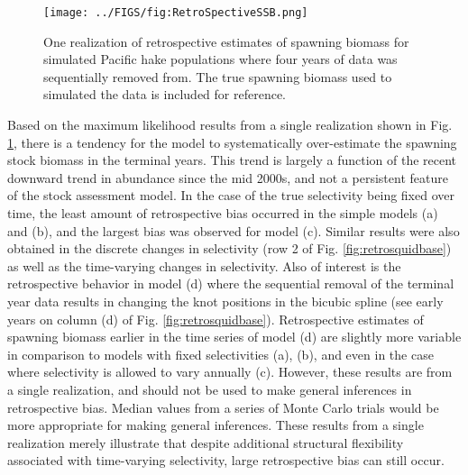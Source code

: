 \begin{figure}[!tbh]
	\begin{center}
		\texttt{[image: ../FIGS/fig:RetroSpectiveSSB.png]}
	\end{center}
	\caption{One realization of retrospective estimates of spawning biomass for simulated Pacific hake populations where four years of data was sequentially removed from.  The true spawning biomass used to simulated the data is included for reference.}
	\label{fig:retrospectiveSSB}
\end{figure}

Based on the maximum likelihood results from a single realization shown in Fig. \ref{fig:retrospectiveSSB}, there is a tendency for the model to systematically over-estimate the spawning stock biomass in the terminal years.  This trend is largely a function of the recent downward trend in abundance since the mid 2000s, and not a persistent feature of the stock assessment model.  In the case of the true selectivity being fixed over time, the least amount of retrospective bias occurred in the simple models (a) and (b), and the largest bias was observed for model (c).  Similar results were also obtained in the discrete changes in selectivity (row 2 of Fig. \ref{fig:retrosquidbase}) as well as the time-varying changes in selectivity.  Also of interest is the retrospective behavior in model (d) where the sequential removal of the terminal year data results in changing the knot positions in the bicubic spline (see early years on column (d) of Fig. \ref{fig:retrosquidbase}). Retrospective  estimates of spawning biomass earlier in the time series of model (d) are slightly more variable in comparison to models with fixed selectivities (a), (b), and even in the case where selectivity is allowed to vary annually (c).  However, these results are from a single realization, and should not be used to make general inferences in retrospective bias.  Median values from a series of Monte Carlo trials would be more appropriate for making general inferences.  These results from a single realization merely illustrate that despite additional structural flexibility associated with time-varying selectivity, large retrospective bias can still occur. 




